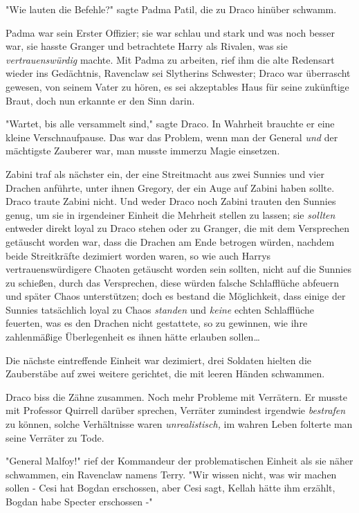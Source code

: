 {"Wie lauten die Befehle?" sagte Padma Patil, die zu Draco hinüber schwamm.

Padma war sein Erster Offizier; sie war schlau und stark und was noch besser war, sie hasste Granger und betrachtete Harry als Rivalen, was sie \emph{vertrauenswürdig} machte. Mit Padma zu arbeiten, rief ihm die alte Redensart wieder ins Gedächtnis, Ravenclaw sei Slytherins Schwester; Draco war überrascht gewesen, von seinem Vater zu hören, es sei akzeptables Haus für seine zukünftige Braut, doch nun erkannte er den Sinn darin.

"Wartet, bis alle versammelt sind," sagte Draco. In Wahrheit brauchte er eine kleine Verschnaufpause. Das war das Problem, wenn man der General \emph{und} der mächtigste Zauberer war, man musste immerzu Magie einsetzen.

Zabini traf als nächster ein, der eine Streitmacht aus zwei Sunnies und vier Drachen anführte, unter ihnen Gregory, der ein Auge auf Zabini haben sollte. Draco traute Zabini nicht. Und weder Draco noch Zabini trauten den Sunnies genug, um sie in irgendeiner Einheit die Mehrheit stellen zu lassen; sie \emph{sollten} entweder direkt loyal zu Draco stehen oder zu Granger, die mit dem Versprechen getäuscht worden war, dass die Drachen am Ende betrogen würden, nachdem beide Streitkräfte dezimiert worden waren, so wie auch Harrys vertrauenswürdigere Chaoten getäuscht worden sein sollten, nicht auf die Sunnies zu schießen, durch das Versprechen, diese würden falsche Schlafflüche abfeuern und später Chaos unterstützen; doch es bestand die Möglichkeit, dass einige der Sunnies tatsächlich loyal zu Chaos \emph{standen} und \emph{keine} echten Schlafflüche feuerten, was es den Drachen nicht gestattete, so zu gewinnen, wie ihre zahlenmäßige Überlegenheit es ihnen hätte erlauben sollen…

Die nächste eintreffende Einheit war dezimiert, drei Soldaten hielten die Zauberstäbe auf zwei weitere gerichtet, die mit leeren Händen schwammen.

Draco biss die Zähne zusammen. Noch mehr Probleme mit Verrätern. Er musste mit Professor Quirrell darüber sprechen, Verräter zumindest irgendwie \emph{bestrafen} zu können, solche Verhältnisse waren \emph{unrealistisch,} im wahren Leben folterte man seine Verräter zu Tode.

"General Malfoy!" rief der Kommandeur der problematischen Einheit als sie näher schwammen, ein Ravenclaw namens Terry. "Wir wissen nicht, was wir machen sollen - Cesi hat Bogdan erschossen, aber Cesi sagt, Kellah hätte ihm erzählt, Bogdan habe Specter erschossen -"

}

